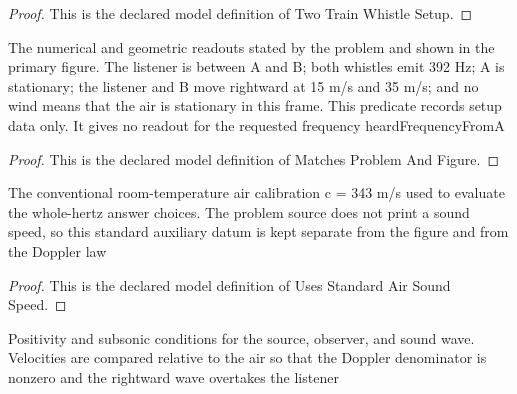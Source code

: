 \begin{proof}
  This is the declared model definition of Two Train Whistle Setup.
\end{proof}
\begin{definition}
  \label{def:physics:phyx-mini-0171:phyxminiproblems-problemphyxmini0171-matchesproblemandfigure}
  The numerical and geometric readouts stated by the problem and shown in the primary figure. The listener is between A and B; both whistles emit 392 Hz; A is stationary; the listener and B move rightward at 15 m/s and 35 m/s; and no wind means that the air is stationary in this frame. This predicate records setup data only. It gives no readout for the requested frequency heardFrequencyFromA
\end{definition}
\begin{proof}
  This is the declared model definition of Matches Problem And Figure.
\end{proof}
\begin{definition}
  \label{def:physics:phyx-mini-0171:phyxminiproblems-problemphyxmini0171-usesstandardairsoundspeed}
  The conventional room-temperature air calibration c = 343 m/s used to evaluate the whole-hertz answer choices. The problem source does not print a sound speed, so this standard auxiliary datum is kept separate from the figure and from the Doppler law
\end{definition}
\begin{proof}
  This is the declared model definition of Uses Standard Air Sound Speed.
\end{proof}
\begin{definition}
  \label{def:physics:phyx-mini-0171:phyxminiproblems-problemphyxmini0171-hassubsonicphysicalparameters}
  Positivity and subsonic conditions for the source, observer, and sound wave. Velocities are compared relative to the air so that the Doppler denominator is nonzero and the rightward wave overtakes the listener
\end{definition}
